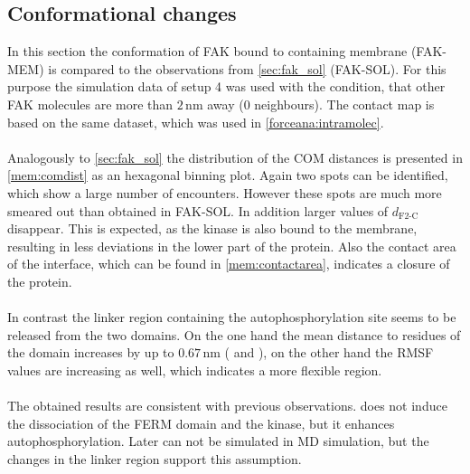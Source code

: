 \subsection{Conformational changes}
In this section the conformation of FAK bound to \pip{} containing membrane (FAK-MEM) is compared to the observations from \autoref{sec:fak_sol} (FAK-SOL). For this purpose the simulation data of setup 4 was used with the condition, that other FAK molecules are more than $2\,\si{\nano\metre}$ away (0 neighbours). The contact map is based on the same dataset, which was used in \autoref{forceana:intramolec}.\\
\\
Analogously to \autoref{sec:fak_sol} the distribution of the COM distances is presented in \autoref{mem:comdist} as an hexagonal binning plot. Again two spots can be identified, which show a large number of encounters. However these spots are much more smeared out than obtained in FAK-SOL. In addition larger values of $d_\text{F2-C}$ disappear. This is expected, as the kinase is also bound to the membrane, resulting in less deviations in the lower part of the protein. Also the contact area of the interface, which can be found in \autoref{mem:contactarea}, indicates a closure of the protein. \\
\\
In contrast the linker region containing the autophosphorylation site  seems to be released from the two domains. On the one hand the mean distance to residues of the domain increases by up to $0.67\,\si{\nano\metre}$ ( and ), on the other hand the RMSF values are increasing as well, which indicates a more flexible region.\\
\\
The obtained results are consistent with previous observations. \pip does not induce the dissociation of the FERM domain and the kinase, but it enhances autophosphorylation. Later can not be simulated in MD simulation, but the changes in the linker region support this assumption.
%
%
%
